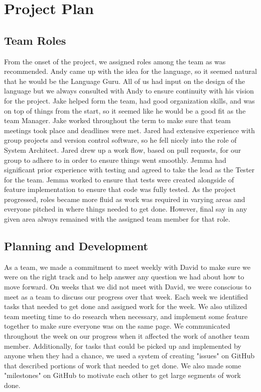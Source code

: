 \documentclass{article}
\begin{document}
\newpage

\section{Project Plan}
\subsection{Team Roles}
From the onset of the project, we assigned roles among the team as was recommended.  Andy came up with the idea for the language, so it seemed natural that he would be the Language Guru.  All of us had input on the design of the language but we always consulted with Andy to ensure continuity with his vision for the project.  Jake helped form the team, had good organization skills, and was on top of things from the start, so it seemed like he would be a good fit as the team Manager.  Jake worked throughout the term to make sure that team meetings took place and deadlines were met.  Jared had extensive experience with group projects and version control software, so he fell nicely into the role of System Architect.  Jared drew up a work flow, based on pull requests, for our group to adhere to in order to ensure things went smoothly.  Jemma had significant prior experience with testing and agreed to take the lead as the Tester for the team.  Jemma worked to ensure that tests were created alongside of feature implementation to ensure that code was fully tested.  As the project progressed, roles became more fluid as work was required in varying areas and everyone pitched in where things needed to get done.  However, final say in any given area always remained with the assigned team member for that role.
\subsection{Planning and Development}
As a team, we made a commitment to meet weekly with David to make sure we were on the right track and to help answer any question we had about how to move forward.  On weeks that we did not meet with David, we were conscious to meet as a team to discuss our progress over that week.  Each week we identified tasks that needed to get done and assigned work for the week.  We also utilized team meeting time to do research when necessary, and implement some feature together to make sure everyone was on the same page.  We communicated throughout the week on our progress when it affected the work of another team member.  Additionally, for tasks that could be picked up and implemented by anyone when they had a chance, we used a system of creating "issues" on GitHub that described portions of work that needed to get done.  We also made some "milestones" on GitHub to motivate each other to get large segments of work done.
\end{document}
